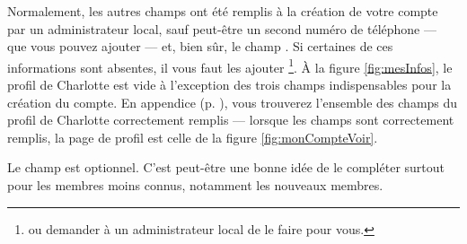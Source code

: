 Normalement, les autres champs ont été remplis à la création de votre compte par un administrateur local, sauf peut-être un second numéro de téléphone --- que vous pouvez ajouter --- et, bien sûr, le champ . Si certaines de ces informations sont absentes, il vous faut les ajouter
\footnote{ou demander à un administrateur local de le faire pour vous.}. 
À la figure \ref{fig:mesInfos}, le profil de Charlotte est vide à l'exception des trois champs indispensables pour la création du compte. En appendice (p. \pageref{fig:profil_charlotte_complet}), vous trouverez l'ensemble des champs du profil de Charlotte correctement remplis --- lorsque les champs sont correctement remplis, la page de profil est celle de la figure \vref{fig:monCompteVoir}.

Le champ  est optionnel. C'est peut-être une bonne idée de le compléter surtout pour les membres moins connus, notamment les nouveaux membres.

